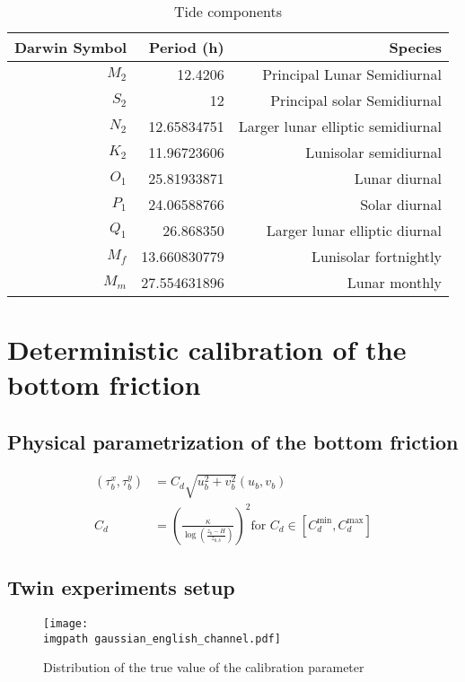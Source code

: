 \documentclass[../../Main_ManuscritThese.tex]{subfiles}
\newcommand\imgpath{/home/victor/acadwriting/Manuscrit/Text/Chapter5/img/}
\begin{document}
\begin{table}[!h]
  \centering %
  \begin{tabular}{rrr}\toprule
    Darwin Symbol & Period (h)& Species \\ \midrule
    $M_2$& 12.4206 & Principal Lunar Semidiurnal \\
    $S_2$& 12 & Principal solar Semidiurnal \\
    $N_2$& 12.65834751& Larger lunar elliptic semidiurnal  \\
    $K_2$& 11.96723606  & Lunisolar semidiurnal \\
    $O_1$& 25.81933871 & Lunar diurnal \\
    $P_1$& 24.06588766 & Solar diurnal\\
    $Q_1$& 26.868350 & Larger lunar elliptic diurnal \\
    $M_f$& 13.660830779 & Lunisolar fortnightly  \\
    $M_m$& 27.554631896 &Lunar monthly  \\
    \bottomrule
  \end{tabular}
  \caption{Tide components}
  \label{tab:tides_components}
\end{table}

\section{Deterministic calibration of the bottom friction}

\subsection{Physical parametrization of the bottom friction}
\begin{align}
  \label{eq:quadratic_friction_vonkarman}
  (\tau_b^x, \tau_b^y) &= C_d \sqrt{u_b^2 + v_b^2}(u_b, v_b) \\  
  C_d &= \left(\frac{\kappa}{\log\left(\frac{z_b - H}{z_{0,b}}\right)}\right)^2 \text{for } C_d \in [C_d^{\min}, C_d^{\max}]
\end{align}


\subsection{Twin experiments setup}
\begin{figure}[ht]
  \centering
  \texttt{[image: \\imgpath gaussian\_english\_channel.pdf]}
  \caption{\label{fig:gaussian_zob} Distribution of the true value of the calibration parameter}
\end{figure}
\end{document}
